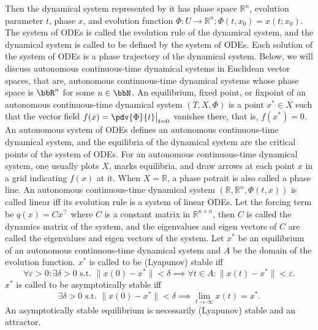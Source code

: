 \documentclass[a4paper,12pt]{report}
\begin{document}
Then the dynamical system represented by it has phase space $\mathbb{R}^n$, evolution parameter $t$, phase $x$, and evolution function $\Phi\colon U\to\mathbb{R}^n;\Phi(t,x_0)=x(t;x_0)$. The system of ODEs is called the evolution rule of the dynamical system, and the dynamical system is called to be defined by the system of ODEs. Each solution of the system of ODEs is a phase trajectory of the dynamical system.
Below, we will discuss autonomous continuous-time dynamical systems in Euclidean vector spaces, that are, autonomous continuous-time dynamical systems whose phase space is $\bbR^n$ for some $n\in\bbN$.
An equilibrium, fixed point, or fixpoint of an autonomous continuous-time dynamical system $(T, X, \Phi)$ is a point $x^*\in X$ such that the vector field $f(x)=\pdv{\Phi}{t}\big\vert_{t=0}$ vanishes there, that is, $f(x^*)=0$.
An autonomous system of ODEs defines an autonomous continuous-time dynamical system, and the equilibria of the dynamical system are the critical points of the system of ODEs.
For an autonomous continuous-time dynamical system, one usually plots $X$, marks equilibria, and draw arrows at each point $x$ in a grid indicating $f(x)$ at it. When $X=\mathbb{R}$, a phase potrait is also called a phase line.
An autonomous continuous-time dynamical system $(\mathbb{R}, \mathbb{R}^n, \Phi(t,x))$ is called linear iff its evolution rule is a system of linear ODEs. Let the forcing term be $q(x)=Cx^\top$ where $C$ is a constant matrix in $\mathbb{R}^{n\times n}$, then $C$ is called the dynamics matrix of the system, and the eigenvalues and eigen vectors of $C$ are called the eigenvalues and eigen vectors of the system.
Let $x^*$ be an equilibrium of an autonomous continuous-time dynamical system and $A$ be the domain of the evolution function.
$x^*$ is called to be (Lyapunov) stable iff    \[\forall\varepsilon>0\colon\exists\delta>0\text{\ s.t.\ }\|x(0)-x^*\|<\delta\implies\forall t\in A\colon\|x(t)-x^*\|<\varepsilon.\]
$x^*$ is called to be asymptotically stable iff
\[\exists\delta>0\text{\ s.t.\ }\|x(0)-x^*\|<\delta\implies\lim_{t\to\infty}x(t)=x^*.\]
An asymptotically stable equilibrium is necessarily (Lyapunov) stable and an attractor.
\end{document}
